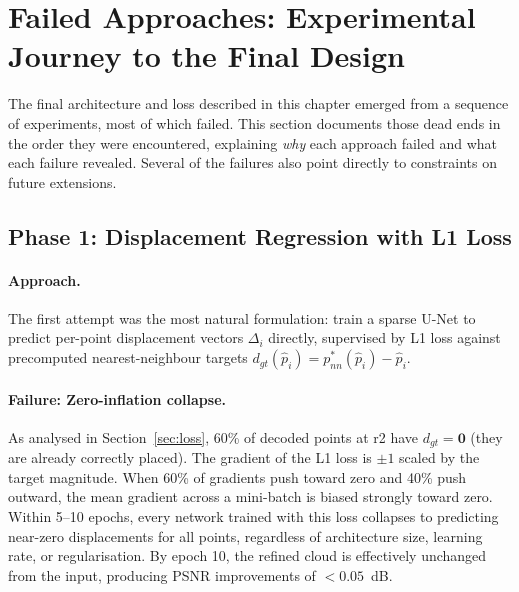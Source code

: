 \section{Failed Approaches: Experimental Journey to the Final Design}
\label{sec:failed-approaches}

The final architecture and loss described in this chapter emerged from a
sequence of experiments, most of which failed.
This section documents those dead ends in the order they were encountered,
explaining \emph{why} each approach failed and what each failure revealed.
Several of the failures also point directly to constraints on future extensions.

\subsection{Phase 1: Displacement Regression with L1 Loss}

\paragraph{Approach.}
The first attempt was the most natural formulation: train a sparse U-Net to
predict per-point displacement vectors $\Delta_i$ directly, supervised by L1
loss against precomputed nearest-neighbour targets
$d_{gt}(\hat{p}_i) = p^*_{nn}(\hat{p}_i) - \hat{p}_i$.

\paragraph{Failure: Zero-inflation collapse.}
As analysed in Section~\ref{sec:loss}, 60\% of decoded points at r2 have
$d_{gt} = \mathbf{0}$ (they are already correctly placed).
The gradient of the L1 loss is $\pm 1$ scaled by the target magnitude.
When 60\% of gradients push toward zero and 40\% push outward, the mean
gradient across a mini-batch is biased strongly toward zero.
Within 5--10 epochs, every network trained with this loss collapses to
predicting near-zero displacements for all points, regardless of architecture
size, learning rate, or regularisation.
By epoch 10, the refined cloud is effectively unchanged from the input,
producing PSNR improvements of $< 0.05$~dB.

